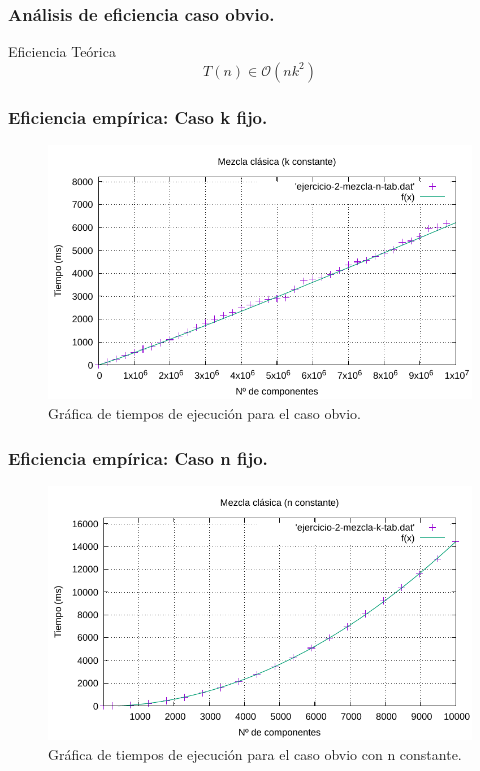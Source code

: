 \documentclass[13pt]{beamer}
\begin{document}
    \begin{frame}
		\frametitle{Análisis de eficiencia caso obvio.}
		 
		 \begin{block}{Eficiencia Teórica}
		 	$$T(n) \in \mathcal{O}(nk^{2})$$
	    \end{block}
	 
	\end{frame}

    \begin{frame}
        \frametitle{Eficiencia empírica: Caso k fijo.}

        \begin{figure}
            \centering
            \includegraphics[scale=0.76]{img/e2a-graph.pdf}
            \caption{Gráfica de tiempos de ejecución para el caso obvio.}
            \label{fig:2a-obvio-n-graph}
        \end{figure}
    \end{frame}

    \begin{frame}
        \frametitle{Eficiencia empírica: Caso n fijo.}

        \begin{figure}
            \centering
            \includegraphics[scale=0.76]{img/e2-obvio-k.pdf}
            \caption{Gráfica de tiempos de ejecución para el caso obvio con n constante.}
            \label{fig:2a-obvio-k-graph}
        \end{figure}
    \end{frame}
\end{document}
